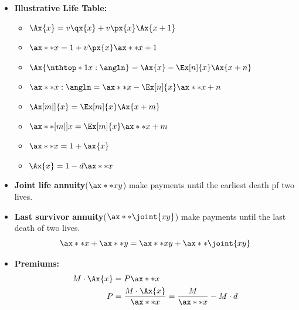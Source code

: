 \documentclass[10pt, french]{article}
\begin{document}
\begin{multicols*}{3}
\begin{itemize}[align=left,leftmargin=*]
    \item \textbf{Illustrative Life Table:}
    \begin{itemize}
        \item $\Ax{x} = v \qx{x} + v \px{x} \Ax{x+1}$
        \item $\ax**{x} = 1 + v \px{x} \ax**{x+1}$
        \item $\Ax{\nthtop*{1}{x}:\angln} = \Ax{x} - \Ex[n]{x} \Ax{x+n}$
        \item $\ax**{x:\angln} = \ax**{x} - \Ex[n]{x} \ax**{x+n}$
        \item $\Ax[m|]{x} = \Ex[m]{x} \Ax{x+m}$
        \item $\ax**[m|]{x} = \Ex[m]{x} \ax**{x+m}$
        \item $\ax**{x} = 1 + \ax{x}$
        \item $\Ax{x} = 1 - d \ax**{x}$
    \end{itemize}
    \columnbreak
    \item \textbf{Joint life annuity}($\ax**{xy}$) make payments until the earliest death pf two lives.
    \item \textbf{Last survivor annuity}($\ax**{\joint{xy}}$) make payments until the last death of two lives. \[ \ax**{x} + \ax**{y} = \ax**{xy} + \ax**{\joint{xy}} \]
    \item \textbf{Premiums:}
    \begin{align*}
        M \cdot \Ax{x} &= P \ax**{x} \\
        P &= \frac{M \cdot \Ax{x}}{\ax**{x}} = \frac{M}{\ax**{x}} - M \cdot d
    \end{align*}
\end{itemize}

\def\SectionColor{orange!80!white}

\end{multicols*}
\end{document}
